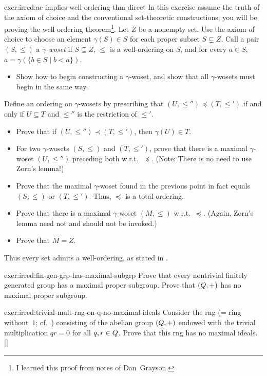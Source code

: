 \begin{exer}{}{exer:irred:ac-implies-well-ordering-thm-direct}
  In this exercise assume the truth of the axiom of choice and the
  conventional set-theoretic constructions; you will be proving the
  well-ordering theorem\footnote{I learned this proof from notes of
    Dan~Grayson.}. Let $Z$ be a nonempty set. Use the axiom of choice
  to choose an element $\gamma(S) \in S$ for each proper subset
  $S \subsetneq Z$. Call a pair $(S, \leq)$ a \emph{$\gamma$-woset} if
  $S \subseteq Z$, $\leq$ is a well-ordering on $S$, and for every
  $a \in S$, $a = \gamma(\{b \in S \mid b < a\})$.
  \begin{itemize}
  \item Show how to begin constructing a $\gamma$-woset, and show that
    all $\gamma$-wosets must begin in the same way.
  \end{itemize}
  Define an ordering on $\gamma$-wosets by prescribing that
  $(U, \leq'') \preceq (T, \leq')$ if and only if $U \subseteq T$ and
  $\leq''$ is the restriction of $\leq'$.
  \begin{itemize}
  \item Prove that if $(U, \leq'') \prec (T, \leq')$, then
    $\gamma(U) \in T$.
  \item For two $\gamma$-wosets $(S, \leq)$ and $(T, \leq')$, prove
    that there is a maximal $\gamma$-woset $(U, \leq'')$ preceding
    both w.r.t.\ $\preceq$. (Note: There is no need to use Zorn's
    lemma!)
  \item Prove that the maximal $\gamma$-woset found in the previous
    point in fact equals $(S, \leq)$ or $(T, \leq')$. Thus, $\preceq$
    is a total ordering.
  \item Prove that there is a maximal $\gamma$-woset $(M, \leq)$
    w.r.t.\ $\preceq$. (Again, Zorn's lemma need not and should not be
    invoked.)
  \item Prove that $M = Z$.
  \end{itemize}
  Thus every set admits a well-ordering, as stated in
  .
\end{exer}
\begin{exer}{}{exer:irred:fin-gen-grp-has-maximal-subgrp}
  Prove that every nontrivial finitely generated group has a maximal
  proper subgroup. Prove that $(Q, +)$ has no maximal proper
  subgroup.
\end{exer}
\begin{exer}{}{exer:irred:trivial-mult-rng-on-q-no-maximal-ideals}
  \exerused{} Consider the rng (= ring without~$1$; cf.\
  ) consisting of the abelian group
  $(Q, +)$ endowed with the trivial multiplication $qr = 0$ for all
  $q, r \in Q$. Prove that this rng has no maximal
  ideals. []
\end{exer}
